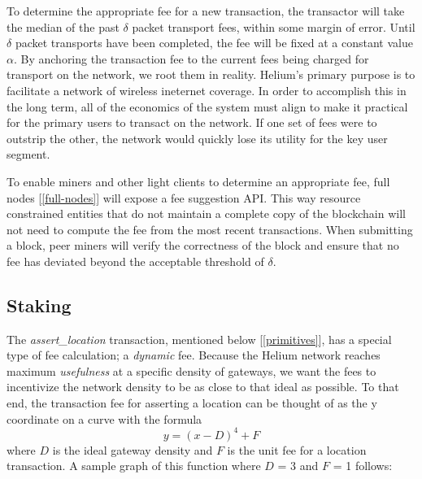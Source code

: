 \documentclass[UTF8, 10pt, nonatbib, nocopyrightspace, reprint]{sigplanconf}
\newcommand{\secref}[1]{[\autoref{#1}]}
\begin{document}
To determine the appropriate fee for a new transaction, the transactor will take the median of the past $\delta$ packet transport fees, within some margin of error. Until $\delta$ packet transports have been completed, the fee will be fixed at a constant value $\alpha$. By anchoring the transaction fee to the current fees being charged for transport on the network, we root them in reality. Helium's primary purpose is to facilitate a network of wireless ineternet coverage. In order to accomplish this in the long term, all of the economics of the system must align to make it practical for the primary users to transact on the network. If one set of fees were to outstrip the other, the network would quickly lose its utility for the key user segment.

To enable miners and other light clients to determine an appropriate fee, full nodes \secref{full-nodes} will expose a fee suggestion API. This way resource constrained entities that do not maintain a complete copy of the blockchain will not need to compute the fee from the most recent transactions. When submitting a block, peer miners will verify the correctness of the block and ensure that no fee has deviated beyond the acceptable threshold of $\delta$.

\subsection{Staking} \label{staking}

The \emph{assert\_location} transaction, mentioned below \secref{primitives}, has a special type of fee calculation; a \emph{dynamic} fee. Because the Helium network reaches maximum \emph{usefulness} at a specific density of gateways, we want the fees to incentivize the network density to be as close to that ideal as possible. To that end, the transaction fee for asserting a location can be thought of as the y coordinate on a curve with the formula \[\mathit{y = \left(x - D\right)^4 + F}\] where $D$ is the ideal gateway density and $F$ is the unit fee for a location transaction. A sample graph of this function where $D$ = 3 and $F$ = 1 follows:

\pgfplotsset{width=12cm,compat=1.9}
\end{document}
